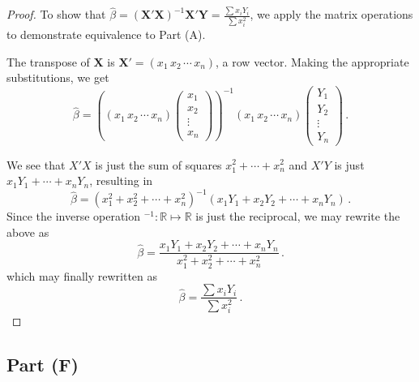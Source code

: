 \documentclass[
]{article}
\begin{document}
\begin{proof}
To show that $\hat\beta = (\mathbf{X}'\mathbf{X})^{-1} \mathbf{X}'\mathbf{Y} = \frac{\sum x_i Y_i}{\sum x_i^2}$,
we apply the matrix operations to demonstrate equivalence to Part (A).

The transpose of $\mathbf{X}$ is $\mathbf{X}' = (x_1 \, x_2 \, \cdots \, x_n)$, a row vector. Making the
appropriate substitutions, we get
\begin{equation}
\hat\beta = \left(
   (x_1 \, x_2 \, \cdots \, x_n)
   \begin{pmatrix}
       x_1\\
       x_2\\
       \vdots\\
       x_n
   \end{pmatrix}
   \right)^{-1}
   (x_1 \, x_2 \, \cdots \, x_n)
   \begin{pmatrix}
       Y_1\\
       Y_2\\
       \vdots\\
       Y_n
   \end{pmatrix}\,.
\end{equation}

We see that $X'X$ is just the sum of squares $x_1^2 + \cdots + x_n^2$ and
$X'Y$ is just $x_1 Y_1 + \cdots + x_n Y_n$, resulting in
\begin{equation*}
\hat\beta = (x^2_1 + x^2_2 + \cdots + x^2_n)^{-1}
   (x_1 Y_1 + x_2 Y_2 + \cdots + x_n Y_n)\,.
\end{equation*}
Since the inverse operation $^{-1} \colon \mathbb{R} \mapsto \mathbb{R}$ is just the reciprocal,
we may rewrite the above as
\begin{equation*}
   \hat\beta = \frac{x_1 Y_1 + x_2 Y_2 + \cdots + x_n Y_n}{x^2_1 + x^2_2 + \cdots + x^2_n}\,.
\end{equation*}
which may finally rewritten as
\begin{equation}
\hat\beta = \frac{\sum x_i Y_i}{\sum x_i^2}\,.
\end{equation}
\end{proof}

\hypertarget{part-f}{%
\subsection{Part (F)}\label{part-f}}

\end{document}
